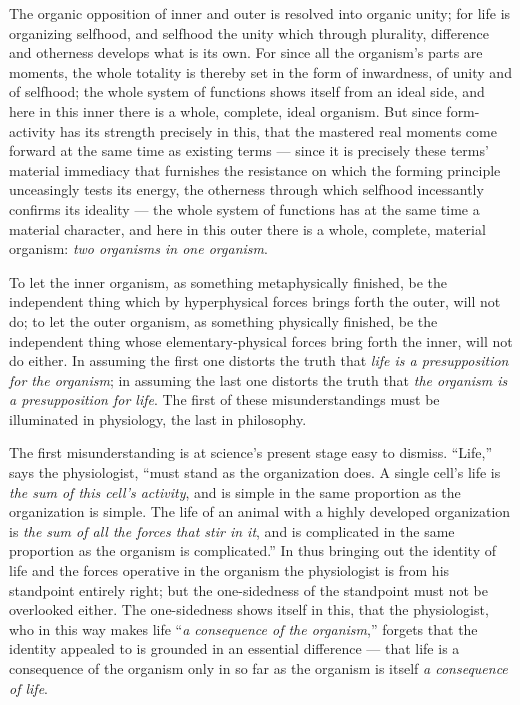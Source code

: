 \documentclass[12pt,a4paper]{book}
\begin{document}
The organic opposition of inner and outer is resolved into organic unity; for
life is organizing selfhood,
and selfhood the unity which through plurality, difference and otherness
develops what is its own. For since all the organism's parts are moments, the
whole totality is thereby set in the form of inwardness, of unity and of
selfhood; the whole system of functions shows itself from an ideal side, and
here in this inner there is a whole, complete, ideal organism. But since
form-activity has its strength precisely in this, that the mastered real
moments come forward at the same time as existing terms --- since it is
precisely these terms' material immediacy that furnishes the resistance on
which the forming principle unceasingly tests its energy, the otherness through
which selfhood incessantly confirms its ideality --- the whole system of
functions has at the same time a material character, and here in this outer
there is a whole, complete, material organism: \emph{two organisms in one
organism}.

To let the inner organism, as something metaphysically finished, be the
independent thing which by hyperphysical forces brings forth the outer, will
not do; to let the outer organism, as something physically finished, be the
independent thing whose elementary-physical forces bring forth the inner, will
not do either. In assuming the first one distorts the truth that
\emph{life is a presupposition for the organism}; in assuming the last one
distorts the truth that \emph{the organism is a presupposition for life}. The
first of these misunderstandings must be illuminated in physiology, the last in
philosophy.

The first misunderstanding is at science's present stage easy to dismiss.
``Life,'' says the physiologist, ``must stand as the organization does. A single
cell's life is \emph{the sum of this cell's activity}, and is simple in the same
proportion as the organization is simple. The life of an animal with a highly
developed organization is \emph{the sum of all the forces that stir in it}, and
is complicated in the same proportion as the organism is complicated.'' In thus
bringing out the identity of life and the forces operative in the organism the
physiologist is from his standpoint entirely right; but the one-sidedness of
the standpoint must not be overlooked either. The one-sidedness shows itself in
this, that the physiologist, who in this way makes life ``\emph{a consequence
of the organism},'' forgets that the identity appealed to is grounded in an
essential difference --- that life is a consequence of the organism only in so
far as the organism is itself \emph{a consequence of life}.
\end{document}
